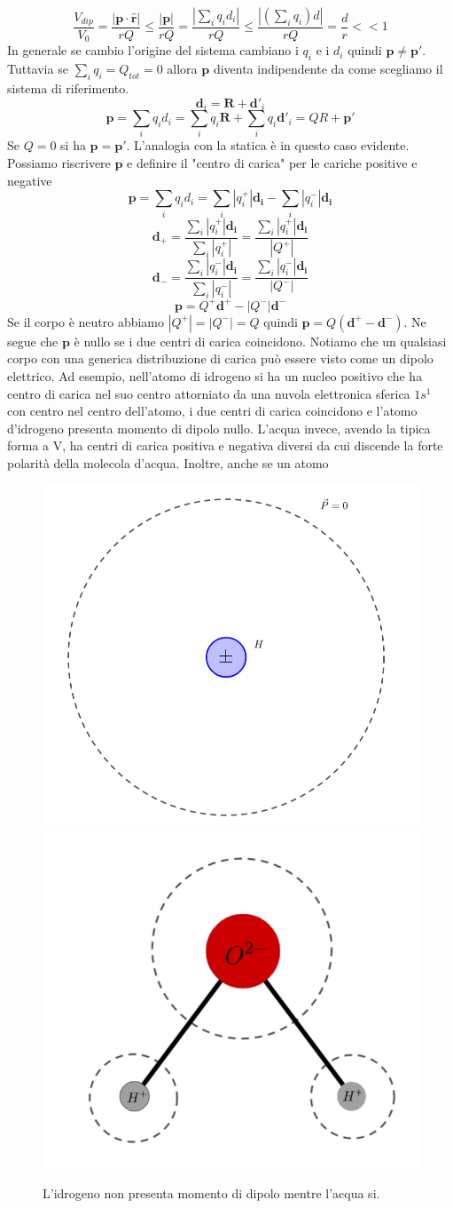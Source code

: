 \documentclass[
10pt, %
a4paper, %
oneside, %
headinclude,footinclude, %
BCOR5mm, %
]{scrartcl}
\begin{document}
 \[\frac{V_{dip}}{V_0} = \frac{|\mathbf{p}\cdot \hat{\mathbf{r}}|}{rQ}\leq\frac{|\mathbf{p}|}{rQ} = \frac{|\sum_i q_i d_i|}{rQ}\leq \frac{|(\sum_i q_i)d|}{rQ} = \frac{d}{r}<<1\]
 In generale se cambio l'origine del sistema cambiano i \(q_i\) e i \(d_i\) quindi \(\mathbf{p}\neq\mathbf{p}'\). Tuttavia se \(\sum_i q_i = Q_{tot} = 0\) allora $\mathbf{p}$ diventa indipendente da come scegliamo il sistema di riferimento. 
\[\mathbf{d}_i = \mathbf{R}+\mathbf{d}'_i\]
\[\mathbf{p} = \sum_iq_id_i = \sum_iq_i\mathbf{R}+\sum_iq_i\mathbf{d}'_i=QR+\mathbf{p}'\]
Se \(Q = 0\) si ha \(\mathbf{p} = \mathbf{p}'\). L'analogia con la statica è in questo caso evidente.\\
Possiamo riscrivere $\mathbf{p}$ e definire il "centro di carica" per le cariche positive e negative 
\[\mathbf{p} = \sum_iq_id_i = \sum_i|q_i^+|\mathbf{d_i}-\sum_i|q_i^-|\mathbf{d_i}\]
\[\mathbf{d}_+ = \frac{\sum_i|q_i^+|\mathbf{d_i}}{\sum_i|q_i^+|} = \frac{\sum_i|q_i^+|\mathbf{d_i}}{|Q^+|}\]
\[\mathbf{d}_- = \frac{\sum_i|q_i^-|\mathbf{d_i}}{\sum_i|q_i^-|} = \frac{\sum_i|q_i^-|\mathbf{d_i}}{|Q^-|}\]
\[\mathbf{p} = Q^+\mathbf{d}^+-|Q^-|\mathbf{d}^-\]
Se il corpo è neutro abbiamo \(|Q^+|=|Q^-|=Q\) quindi \(\mathbf{p} = Q(\mathbf{d}^+-\mathbf{d}^-)\). Ne segue che $\mathbf{p}$ è nullo se i due centri di carica coincidono. Notiamo che un qualsiasi corpo con una generica distribuzione di carica può essere visto come un dipolo elettrico. Ad esempio, nell'atomo di idrogeno si ha un nucleo positivo che ha centro di carica nel suo centro attorniato da una nuvola elettronica sferica \(1s^1\) con centro nel centro dell'atomo, i due centri di carica coincidono e l'atomo d'idrogeno presenta momento di dipolo nullo. L'acqua invece, avendo la tipica forma a V, ha centri di carica positiva e negativa diversi da cui discende la forte polarità della molecola d'acqua. Inoltre, anche se un atomo 
\begin{figure}[h!]
	\centering
	\includegraphics[width=0.4\linewidth]{../images/dielettrico_idrogeno_1}\quad
	\includegraphics[width=0.5\linewidth]{../images/dipolo_H_H2O}
	\caption{L'idrogeno non presenta momento di dipolo mentre l'acqua si.}
	\label{fig:dipolohh2o}
\end{figure}
\FloatBarrier
\newpage
\end{document}
